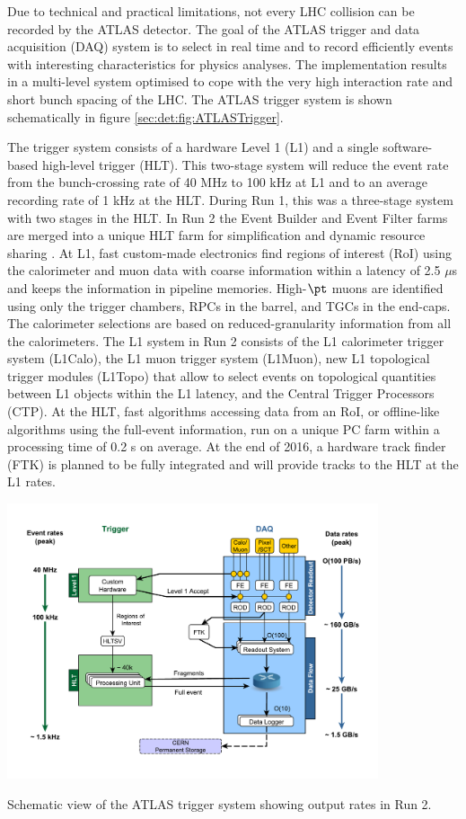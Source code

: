 Due to technical and practical limitations, not every LHC collision can be recorded by the ATLAS detector. The goal of the ATLAS trigger and data acquisition (DAQ) system is to select in real time and to record efficiently events with interesting characteristics for physics analyses. The implementation results in a multi-level system optimised to cope with the very high interaction rate and short bunch spacing of the LHC. The ATLAS trigger system is shown schematically in figure \ref{sec:det:fig:ATLASTrigger}.\par
The trigger system consists of a hardware Level 1 (L1) and a single software-based high-level trigger (HLT). This two-stage system will reduce the event rate from the bunch-crossing rate of 40 MHz to 100 kHz at L1 and to an average recording rate of 1 kHz at the HLT. During Run 1, this was a three-stage system with two stages in the HLT. In Run 2 the Event Builder and Event Filter farms are merged into a unique HLT farm for simplification and dynamic resource sharing \cite{DAQTDR}.  At L1, fast custom-made electronics find regions of interest (RoI) using the calorimeter and muon data with coarse information within a latency of 2.5 $\mu$s and keeps the information in pipeline memories. High-$\pt$ muons are identified using only the trigger chambers, RPCs in the barrel, and TGCs in the end-caps. The calorimeter selections  are  based  on  reduced-granularity  information  from  all  the  calorimeters. 
The L1 system in Run 2 consists of the L1 calorimeter trigger system (L1Calo), the L1 muon trigger system (L1Muon), new L1 topological trigger modules (L1Topo) that allow to select events on topological quantities between L1 objects within the L1 latency, and the Central Trigger Processors (CTP). 
At the HLT, fast algorithms accessing data from an RoI, or offline-like algorithms using the full-event information, run on a unique PC farm within a processing time of 0.2 s on average. At the end of 2016, a hardware track finder (FTK) is planned to be fully integrated and will provide tracks to the HLT at the L1 rates. 

\bfig[h!]
\centering
\includegraphics[width=0.82\textwidth]{figures/Detector/tdaqFullNew2016.pdf}
\captionsetup{width=0.85\textwidth} \caption{\small Schematic view of the ATLAS trigger system showing output rates in Run 2.}
\label{sec:det:fig:ATLASTrigger}
\efig


